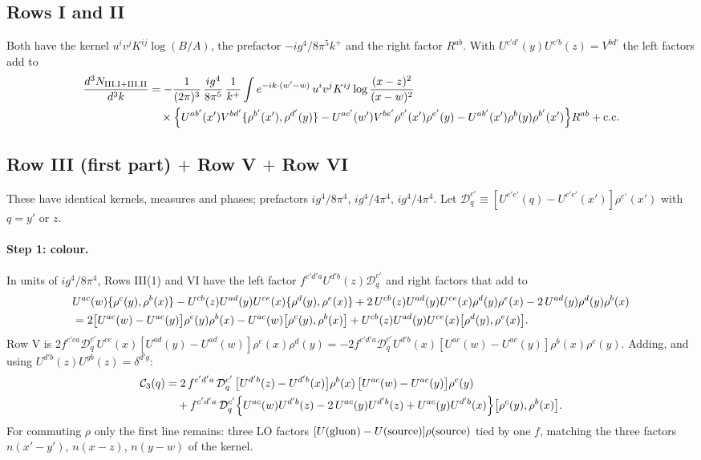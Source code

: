 \documentclass[10pt]{article}
\numberwithin{equation}{section}
\begin{document}
\subsection{Rows I and II}
Both have the kernel $u^{i}v^{j}K^{ij}\log(B/A)$, the prefactor $-ig^{4}/8\pi^{5}k^{+}$ and the right factor $R^{ab}$. With $U^{c'd'}(y)U^{c'b}(z)=V^{bd'}$ the left factors add to
\begin{align}
\frac{d^{3}N_{\rm III.I+III.II}}{d^{3}k}&=-\frac{1}{(2\pi)^{3}}\,\frac{ig^{4}}{8\pi^{5}}\,\frac{1}{k^{+}}\int e^{-ik\cdot(w'-w)}\,u^{i}v^{j}K^{ij}\log\frac{(x-z)^{2}}{(x-w)^{2}}\notag\\
&\quad\times\Big\{U^{ab'}(x')V^{bd'}\{\rho^{b'}(x'),\rho^{d'}(y)\}-U^{ac'}(w')V^{be'}\rho^{c'}(x')\rho^{e'}(y)-U^{ab'}(x')\rho^{b}(y)\rho^{b'}(x')\Big\}R^{ab}+{\rm c.c.}
\end{align}

\subsection{Row III (first part) $+$ Row V $+$ Row VI}
These have identical kernels, measures and phases; prefactors $ig^{4}/8\pi^{4}$, $ig^{4}/4\pi^{4}$, $ig^{4}/4\pi^{4}$. Let $\mathcal{D}^{c'}_{q}\equiv[U^{c'e'}(q)-U^{c'e'}(x')]\rho^{e'}(x')$ with $q=y'$ or $z$.

\paragraph{Step 1: colour.} In units of $ig^{4}/8\pi^{4}$, Rows III(1) and VI have the left factor $f^{c'd'a}U^{d'b}(z)\mathcal{D}^{c'}_{q}$ and right factors that add to
\begin{align}
&U^{ac}(w)\{\rho^{c}(y),\rho^{b}(x)\}-U^{cb}(z)U^{ad}(y)U^{ce}(x)\{\rho^{d}(y),\rho^{e}(x)\}+2\,U^{cb}(z)U^{ad}(y)U^{ce}(x)\rho^{d}(y)\rho^{e}(x)-2\,U^{ad}(y)\rho^{d}(y)\rho^{b}(x)\notag\\
&=2\big[U^{ac}(w)-U^{ac}(y)\big]\rho^{c}(y)\rho^{b}(x)-U^{ac}(w)\big[\rho^{c}(y),\rho^{b}(x)\big]+U^{cb}(z)U^{ad}(y)U^{ce}(x)\big[\rho^{d}(y),\rho^{e}(x)\big].
\end{align}
Row V is $2f^{c'ca}\mathcal{D}^{c'}_{q}U^{ce}(x)[U^{ad}(y)-U^{ad}(w)]\rho^{e}(x)\rho^{d}(y)=-2f^{c'd'a}\mathcal{D}^{c'}_{q}U^{d'b}(x)[U^{ac}(w)-U^{ac}(y)]\rho^{b}(x)\rho^{c}(y)$. Adding, and using $U^{d'b}(z)U^{gb}(z)=\delta^{d'g}$:
\begin{align}
\mathcal{C}_{3}(q)&=2\,f^{c'd'a}\,\mathcal{D}^{c'}_{q}\,\big[U^{d'b}(z)-U^{d'b}(x)\big]\rho^{b}(x)\,\big[U^{ac}(w)-U^{ac}(y)\big]\rho^{c}(y)\notag\\
&\quad+f^{c'd'a}\,\mathcal{D}^{c'}_{q}\Big\{U^{ac}(w)U^{d'b}(z)-2\,U^{ac}(y)U^{d'b}(z)+U^{ac}(y)U^{d'b}(x)\Big\}\big[\rho^{c}(y),\rho^{b}(x)\big]. \label{eq:C3}
\end{align}
For commuting $\rho$ only the first line remains: three LO factors $[U({\rm gluon})-U({\rm source})]\rho({\rm source})$ tied by one $f$, matching the three factors $n(x'-y')$, $n(x-z)$, $n(y-w)$ of the kernel.
\end{document}
